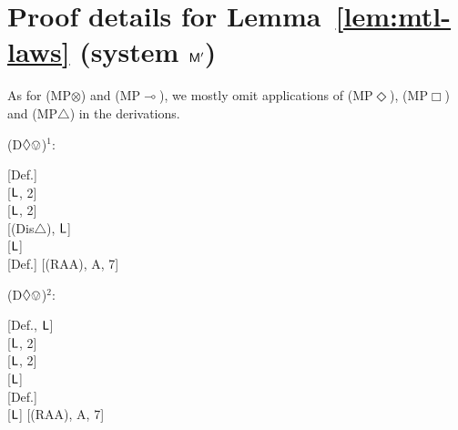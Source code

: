 \documentclass[a4paper,english,fleqn,11pt,final]{scrartcl}
\newcommand{\negg}{{\sim}}
\newcommand{\sfL}{\protect\ensuremath{\mathsf{L}}}
\newcommand{\sfM}{\protect\ensuremath{\mathsf{M}}}
\newcommand{\limp}{\multimap}
\newcommand{\tens}{\otimes}
\newcommand{\Deriv}[1]{{\normalfont\textsf{#1}}}
\newcommand{\oland}{\owedge}
\theoremstyle{plain}
\theoremstyle{definition}
\begin{document}
\section{Proof details for Lemma~\ref{lem:mtl-laws} (system $\sfM'$)}

\label{sec:aux-modal}

As for \Deriv{(MP$\tens$)} and \Deriv{(MP$\limp$)}, we mostly omit applications of \Deriv(MP$\Diamond$), \Deriv(MP$\Box$) and \Deriv(MP$\triangle$) in the derivations.

\bigskip

{
\scriptsize




\begin{minipage}[t][][b]{.43\textwidth}

\Deriv{(D$\Diamond\ovee$)$^1$}:

\medskip

{
\setlength{\fitchprfwidth}{1.33in}
\fitchprf{
\pline[A ]{\Diamond(\varphi\ovee\psi)}
}
{
\subproof{\pline[1 ]{\negg\Diamond\varphi \ovee \Diamond\psi)}}
{
	\pline[2 ]{\negg(\negg\triangle\negg\varphi \ovee \negg\triangle\negg\psi)\hspace{-9pt}}[Def.]\\
	\pline[3 ]{\triangle\negg\varphi}[$\sfL$, 2]\\
	\pline[4 ]{\triangle\negg\psi}[$\sfL$, 2]\\
	\pline[5 ]{\triangle\negg(\varphi \ovee \psi)}[\Deriv{(Dis$\triangle$)}, $\sfL$]\\
	\pline[6 ]{\negg\negg\triangle\negg(\varphi \ovee \psi)}[$\sfL$]\\
	\pline[7 ]{\negg\Diamond(\varphi \ovee \psi)}[Def.]
}
	\pline[\slider]{\Diamond\varphi \ovee \Diamond\psi}[\Deriv{(RAA)}, A, 7]
}
}
\end{minipage}
\begin{minipage}[t][][b]{.46\textwidth}

\Deriv{(D$\Diamond\ovee$)$^2$}:

\medskip

{
\setlength{\fitchprfwidth}{1.58in}
\fitchprf{
\pline[A ]{\Diamond\varphi \ovee \Diamond\psi}
}
{
\subproof{\pline[1 ]{\negg\Diamond(\varphi \ovee\psi)}}
{
	\pline[2 ]{\triangle\negg(\varphi \ovee \psi)}[Def., $\sfL$]\\
	\pline[3 ]{\triangle\negg\varphi}[$\sfL$, 2]\\
	\pline[4 ]{\triangle\negg\psi}[$\sfL$, 2]\\
	\pline[5 ]{(\negg\negg\triangle\negg\varphi) \oland (\negg\negg\triangle\negg\psi)}[$\sfL$]\\
	\pline[6 ]{(\negg \Diamond\varphi) \oland (\negg\Diamond\psi)}[Def.]\\
	\pline[7 ]{\negg(\Diamond \varphi \ovee \Diamond \psi)}[$\sfL$]
}
	\pline[\slider]{\Diamond(\varphi \ovee\psi)}[\Deriv{(RAA)}, A, 7]
}
}
\end{minipage}




}
\end{document}

